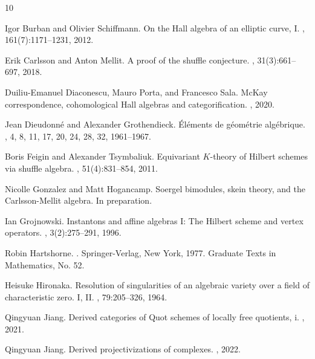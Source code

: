 \documentclass{amsart}
\numberwithin{equation}{section}
\theoremstyle{definition}
\theoremstyle{remark}
\begin{document}
\begin{thebibliography}{10}

Igor Burban and Olivier Schiffmann.
\newblock On the {H}all algebra of an elliptic curve, {I}.
, 161(7):1171--1231, 2012.

Erik Carlsson and Anton Mellit.
\newblock A proof of the shuffle conjecture.
, 31(3):661--697,
  2018.

Duiliu-Emanuel Diaconescu, Mauro Porta, and Francesco Sala.
\newblock Mc{K}ay correspondence, cohomological {H}all algebras and
  categorification.
, 2020.

Jean Dieudonn{\'e} and Alexander Grothendieck.
\newblock \'{E}l\'ements de g\'eom\'etrie alg\'ebrique.
, 4, 8, 11, 17, 20, 24,
  28, 32, 1961--1967.

Boris Feigin and Alexander Tsymbaliuk.
\newblock Equivariant {$K$}-theory of {H}ilbert schemes via shuffle algebra.
, 51(4):831--854, 2011.

Nicolle Gonzalez and Matt Hogancamp.
\newblock Soergel bimodules, skein theory, and the {Carlsson-Mellit} algebra.
\newblock In preparation.

Ian Grojnowski.
\newblock Instantons and affine algebras {I}: The {Hilbert} scheme and vertex
  operators.
, 3(2):275--291, 1996.

Robin Hartshorne.
.
\newblock Springer-Verlag, New York, 1977.
\newblock Graduate Texts in Mathematics, No. 52.

Heisuke Hironaka.
\newblock Resolution of singularities of an algebraic variety over a field of
  characteristic zero. {I}, {II}.
,
  79:205--326, 1964.

Qingyuan Jiang.
\newblock Derived categories of {Q}uot schemes of locally free quotients, i.
, 2021.

Qingyuan Jiang.
\newblock Derived projectivizations of complexes.
, 2022.


\end{thebibliography}
\end{document}
